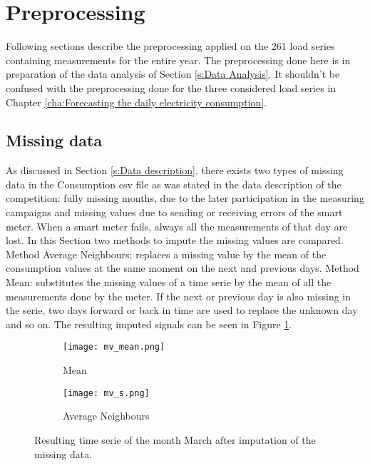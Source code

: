 \section{Preprocessing}\label{s:Preprocessing}

Following sections describe the preprocessing applied on the 261 load series containing measurements for the entire year. The preprocessing done here is in preparation of the data analysis of Section \ref{s:Data Analysis}. It shouldn't be confused with the preprocessing done for the three considered load series in Chapter \ref{cha:Forecasting the daily electricity consumption}.

\subsection{Missing data} \label{s:missing_data}
As discussed in Section \ref{s:Data description}, there exists two types of missing data in the Consumption csv file as was stated in the data description of the competition: fully missing months, due to the later participation in the measuring campaigns and missing values due to sending or receiving errors of the smart meter. When a smart meter fails, always all the measurements of that day are lost. In this Section two methods to impute the missing values are compared. Method Average Neighbours: replaces a missing value by the mean of the consumption values at the same moment on the next and previous days. Method Mean: substitutes the missing values of a time serie by the mean of all the measurements done by the meter. If the next or previous day is also missing in the serie, two days forward or back in time are used to replace the unknown day and so on. The resulting imputed signals can be seen in Figure \ref{fig:missing_values_imputing}. \\

\begin{figure}[h]
	\begin{subfigure}{0.5\textwidth}
		\texttt{[image: mv\_mean.png]}
		\caption{Mean}
	\end{subfigure}	
	\begin{subfigure}{0.5\textwidth}
		\texttt{[image: mv\_s.png]}
		\caption{Average Neighbours}
	\end{subfigure}
	\caption{Resulting time serie of the month March after imputation of the missing data.}
	\label{fig:missing_values_imputing}
\end{figure}

